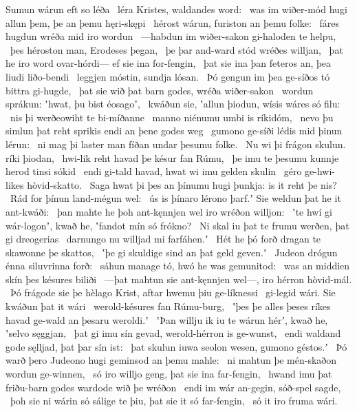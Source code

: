 Sumun wárun eft so léða \hld\ léra Kristes,
waldandes word: \hld\ was im wiðer-mód hugi
allun þem, þe an þemu hęri-skępi \hld\ hérost wárun,
furiston an þemu folke: \hld\ fáres hugdun
wréða mid iro wordun \hld\ —habdun im wiðer-sakon
gi-haloden te helpu, \hld\ þes héroston man,
Erodeses þegan, \hld\ þe þar and-ward stód
wréðes willjan, \hld\ þat he iro word ovar-hórdi—
ef sie ina for-fengin, \hld\ þat sie ina þan feteros an,
þea liudi liðo-bendi \hld\ leggjen móstin,
sundja lósan. \hld\ Þó gengun im þea ge-síðos tó
bittra gi-hugde, \hld\ þat sie wið þat barn godes,
wréða wiðer-sakon \hld\ wordun sprákun:
ʽhwat, þu bist éosagoʼ, \hld\ kwáðun sie, ʽallun þiodun,
wísis wáres só filu: \hld\ nis þi werðeowiht
te bi-míðanne \hld\ manno niénumu
umbi is ríkidóm, \hld\ nevo þu simlun þat reht sprikis
endi an þene godes weg \hld\ gumono ge-síði
lédis mid þinun lérun: \hld\ ni mag þi laster man
fíðan undar þesumu folke. \hld\ Nu wi þi frágon skulun.
ríki þiodan, \hld\ hwi-lik reht havad
þe késur fan Rúmu, \hld\ þe imu te þesumu kunnje herod
tinsi sókid \hld\ endi gi-tald havad,
hwat wi imu gelden skulin \hld\ géro ge-hwi-likes
hòvid-skatto. \hld\ Saga hwat þi þes an þínumu hugi þunkja:
is it reht þe nis? \hld\ Rád for þínun
land-mégun wel: \hld\ ús is þínaro lérono þarf.ʼ
Sie weldun þat he it ant-kwáði: \hld\ þan mahte he þoh ant-kęnnjen wel
iro wréðon willjon: \hld\ ʽte hwí gi wár-logonʼ, kwað he,
ʽfandot mín só frókno? \hld\ Ni skal iu þat te frumu werðen,
þat gi dreogerias \hld\ darnungo nu
willjad mi farfáhen.ʼ \hld\ Hét he þó forð dragan
te skawonne þe skattos, \hld\ ʽþe gi skuldige sind
an þat geld geven.ʼ \hld\ Judeon drógun
énna siluvrinna forð: \hld\ sáhun manage tó,
hwó he was gemunitod: \hld\ was an middien skín
þes késures biliði \hld\ —þat mahtun sie ant-kęnnjen wel—,
iro hérron hòvid-mál. \hld\ Þó frágode sie þe hèlago Krist,
aftar hwemu þiu ge-líknessi \hld\ gi-legid wári.
Sie kwáðun þat it wári \hld\ werold-késures
fan Rúmu-burg, \hld\ ʽþes þe alles þeses ríkes havad
ge-wald an þesaru weroldi.ʼ \hld\ ʽÞan willju ik iu te wárun hérʼ, kwað he,
ʽselvo sęggjan, \hld\ þat gi imu sín gevad,
werold-hérron is ge-wunst, \hld\ endi waldand gode
sęlljad, þat þar sín ist: \hld\ þat skulun iuwa seolon wesen,
gumono géstos.ʼ \hld\ Þó warð þero Judeono hugi
geminsod an þemu mahle: \hld\ ni mahtun þe mén-skaðon
wordun ge-winnen, \hld\ só iro willjo geng,
þat sie ina far-fengin, \hld\ hwand imu þat friðu-barn godes
wardode wið þe wréðon \hld\ endi im wár an-gegin,
sóð-spel sagde, \hld\ þoh sie ni wárin só sálige te þiu,
þat sie it só far-fengin, \hld\ só it iro fruma wári.
